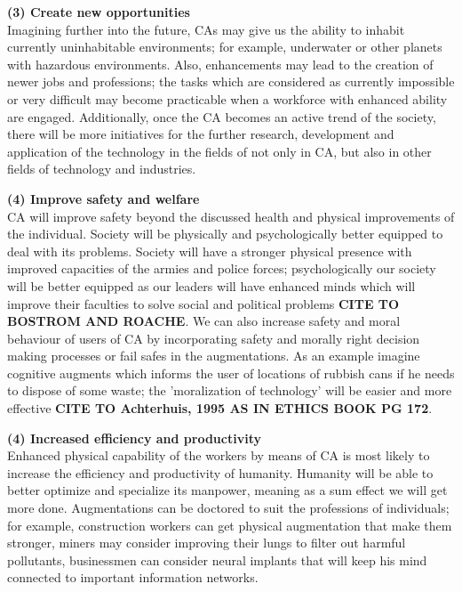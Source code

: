 {\bf (3) Create new opportunities}\\
Imagining further into the future, CAs may give us the ability to inhabit currently uninhabitable environments; for example, underwater or other planets with hazardous environments. Also, enhancements may lead to the creation of newer jobs and professions; the tasks which are considered as currently impossible or very difficult may become practicable when a workforce with enhanced ability are engaged. Additionally, once the CA becomes an active trend of the society, there will be more initiatives for the further research, development and application of the technology in the fields of not only in CA, but also in other fields of technology and industries.

{\bf (4) Improve safety and welfare}\\
CA will improve safety beyond the discussed health and physical improvements of the individual. Society will be physically and psychologically better equipped to deal with its problems. Society will have a stronger physical presence with improved capacities of the armies and police forces; psychologically our society will be better equipped as our leaders will have enhanced minds which will improve their faculties to solve social and political problems {\bf CITE TO BOSTROM AND ROACHE}. We can also increase safety and moral behaviour of users of CA by incorporating safety and morally right decision making processes or fail safes in the augmentations. As an example imagine cognitive augments which informs the user of locations of rubbish cans if he needs to dispose of some waste; the 'moralization of technology' will be easier and more effective {\bf CITE TO Achterhuis, 1995 AS IN ETHICS BOOK PG 172}.

{\bf (4) Increased efficiency and productivity} \\
Enhanced physical capability of the workers by means of CA is most likely to increase the efficiency and productivity of humanity. Humanity will be able to better optimize and specialize its manpower, meaning as a sum effect we will get more done. Augmentations can be doctored to suit the professions of individuals; for example, construction workers can get physical augmentation that make them stronger, miners may consider improving their lungs to filter out harmful pollutants, businessmen can consider neural implants that will keep his mind connected to important information networks.

